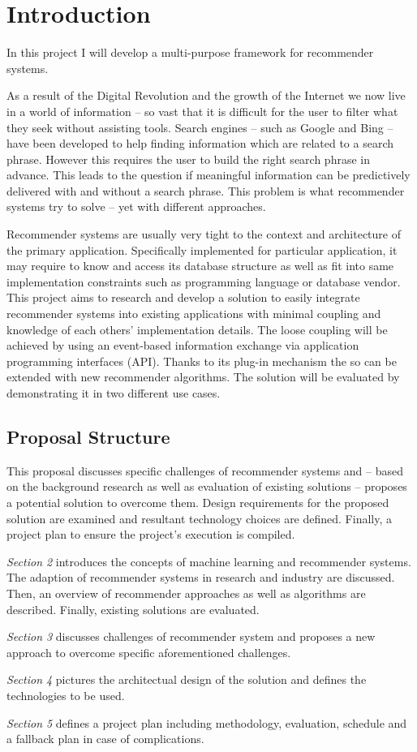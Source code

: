\chapter{Introduction}

In this project I will develop a multi-purpose framework for recommender systems.

As a result of the Digital Revolution and the growth of the Internet we now live in a world of information -- so vast that it is difficult for the user to filter what they seek without assisting tools. Search engines -- such as Google and Bing -- have been developed to help finding information which are related to a search phrase. However this requires the user to build the right search phrase in advance. This leads to the question if meaningful information can be predictively delivered with and without a search phrase. This problem is what recommender systems try to solve -- yet with different approaches.

Recommender systems are usually very tight to the context and architecture of the primary application. Specifically implemented for particular application, it may require to know and access its database structure as well as fit into same implementation constraints such as programming language or database vendor. This project aims to research and develop a solution to easily integrate recommender systems into existing applications with minimal coupling and knowledge of each others' implementation details. The loose coupling will be achieved by using an event-based information exchange via application programming interfaces (API). Thanks to its plug-in mechanism the so can be extended with new recommender algorithms. The solution will be evaluated by demonstrating it in two different use cases.

\section{Proposal Structure}

This proposal discusses specific challenges of recommender systems and -- based on the background research as well as evaluation of existing solutions -- proposes a potential solution to overcome them. Design requirements for the proposed solution are examined and resultant technology choices are defined. Finally, a project plan to ensure the project's execution is compiled.

\textit{Section 2} introduces the concepts of machine learning and recommender systems. The adaption of recommender systems in research and industry are discussed. Then, an overview of recommender approaches as well as algorithms are described. Finally, existing solutions are evaluated.

\textit{Section 3} discusses challenges of recommender system and proposes a new approach to overcome specific aforementioned challenges.

\textit{Section 4} pictures the architectual design of the solution and defines the technologies to be used.

\textit{Section 5} defines a project plan including methodology, evaluation, schedule and a fallback plan in case of complications.